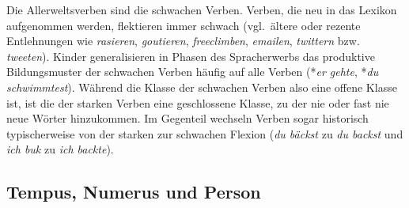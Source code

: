 \begin{table}[!htbp]
  \caption{Vokalstufen an Beispielen}
  \label{tab:unterklassen081}
\end{table}

Die Allerweltsverben sind die schwachen Verben.
Verben, die neu in das Lexikon aufgenommen werden, flektieren immer schwach (vgl.\ ältere oder rezente Entlehnungen wie \textit{rasieren}, \textit{goutieren}, \textit{freeclimben}, \textit{emailen}, \textit{twittern} bzw. \textit{tweeten}).
Kinder generalisieren in Phasen des Spracherwerbs das produktive Bildungsmuster der schwachen Verben häufig auf alle Verben (*\textit{er gehte}, *\textit{du schwimmtest}).
Während die Klasse der schwachen Verben also eine offene Klasse ist, ist die der starken Verben eine geschlossene Klasse, zu der nie oder fast nie neue Wörter hinzukommen.
Im Gegenteil wechseln Verben sogar historisch typischerweise von der starken zur schwachen Flexion (\textit{du bäckst} zu \textit{du backst} und \textit{ich buk} zu \textit{ich backte}).

\subsection{Tempus, Numerus und Person}
\label{sec:tempusnumerusundperson}

